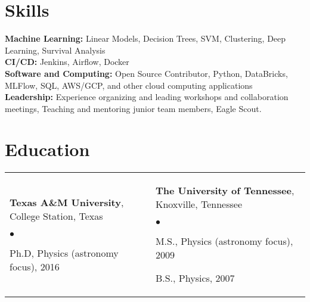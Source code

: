\documentclass[margin,line, 11pt]{res}
\newenvironment{list2}{
  \begin{list}{$\bullet$}{%
      \setlength{\itemsep}{0in}
      \setlength{\parsep}{0in} \setlength{\parskip}{0in}
      \setlength{\topsep}{0in} \setlength{\partopsep}{0in}
      \setlength{\leftmargin}{0.2in}}}{\end{list}}
\begin{document}
\begin{resume}

\section{Skills}
\textbf{Machine Learning:} Linear Models, Decision Trees, SVM, Clustering, Deep Learning, Survival Analysis\\
\textbf{CI/CD:} Jenkins, Airflow, Docker\\
\textbf{Software and Computing:} Open Source Contributor, Python, DataBricks, MLFlow, SQL, AWS/GCP, and other cloud computing applications \\
\textbf{Leadership:} Experience organizing and leading workshops and collaboration meetings, Teaching and mentoring junior team members, Eagle Scout. \\
\vspace*{-7mm}

\section{Education}
\begin{tabular}{@{}p{3in}p{3in}}
  \textbf{Texas A\&M University}, College Station, Texas
  \begin{list2}
  	\item Ph.D, Physics (astronomy focus), 2016
  \end{list2} &
  \textbf{The University of Tennessee}, Knoxville, Tennessee
  \begin{list2}
  	\item M.S., Physics (astronomy focus), 2009
  	\item B.S., Physics, 2007
  \end{list2} \\
\end{tabular}
\vspace*{-4mm}

\end{resume}
\end{document}
